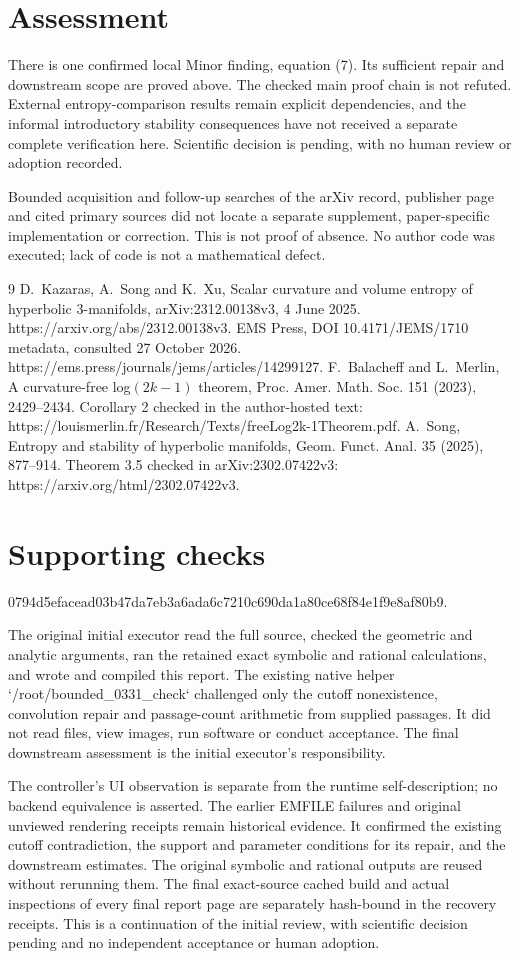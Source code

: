 \documentclass[10pt]{article}
\begin{document}
\section*{Assessment}
There is one confirmed local Minor finding, equation (7). Its sufficient repair and downstream scope are proved above. The checked main proof chain is not refuted. External entropy-comparison results remain explicit dependencies, and the informal introductory stability consequences have not received a separate complete verification here. Scientific decision is pending, with no human review or adoption recorded.\par
Bounded acquisition and follow-up searches of the arXiv record, publisher page and cited primary sources did not locate a separate supplement, paper-specific implementation or correction. This is not proof of absence. No author code was executed; lack of code is not a mathematical defect.\par
9 D. Kazaras, A. Song and K. Xu, Scalar curvature and volume entropy of hyperbolic 3-manifolds, arXiv:2312.00138v3, 4 June 2025. https://arxiv.org/abs/2312.00138v3. EMS Press, DOI 10.4171/JEMS/1710 metadata, consulted 27 October 2026. https://ems.press/journals/jems/articles/14299127. F. Balacheff and L. Merlin, A curvature-free log\((2k-1)\) theorem, Proc. Amer. Math. Soc. 151 (2023), 2429–2434. Corollary 2 checked in the author-hosted text: https://louismerlin.fr/Research/Texts/freeLog2k-1Theorem.pdf. A. Song, Entropy and stability of hyperbolic manifolds, Geom. Funct. Anal. 35 (2025), 877–914. Theorem 3.5 checked in arXiv:2302.07422v3: https://arxiv.org/html/2302.07422v3.\par
\section*{Supporting checks}
0794d5efacead03b47da7eb3a6ada6c7210c690da1a80ce68f84e1f9e8af80b9.\par
The original initial executor read the full source, checked the geometric and analytic arguments, ran the retained exact symbolic and rational calculations, and wrote and compiled this report. The existing native helper `/root/bounded\_0331\_check` challenged only the cutoff nonexistence, convolution repair and passage-count arithmetic from supplied passages. It did not read files, view images, run software or conduct acceptance. The final downstream assessment is the initial executor’s responsibility.\par
The controller’s UI observation is separate from the runtime self-description; no backend equivalence is asserted. The earlier EMFILE failures and original unviewed rendering receipts remain historical evidence. It confirmed the existing cutoff contradiction, the support and parameter conditions for its repair, and the downstream estimates. The original symbolic and rational outputs are reused without rerunning them. The final exact-source cached build and actual inspections of every final report page are separately hash-bound in the recovery receipts. This is a continuation of the initial review, with scientific decision pending and no independent acceptance or human adoption.\par
\end{document}
